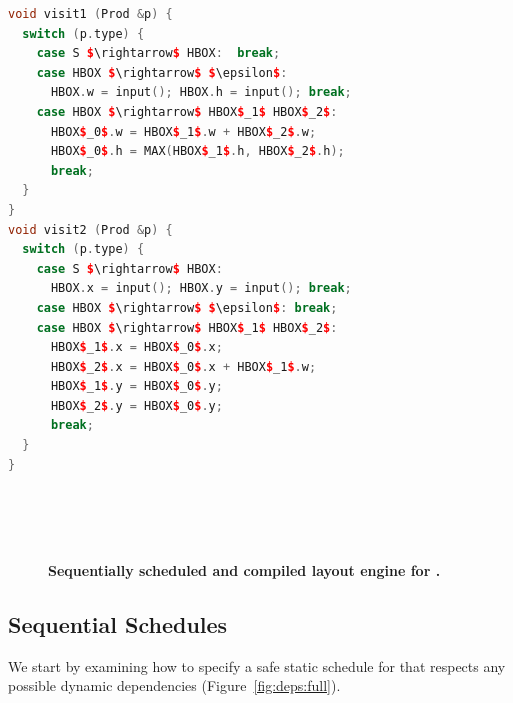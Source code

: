 \newsavebox{\hboxvisitors}
\begin{lrbox}{\hboxvisitors}%
\begin{minipage}{1\columnwidth}
\begin{lstlisting}[mathescape,language=C++]
void visit1 (Prod &p) {
  switch (p.type) {
    case S $\rightarrow$ HBOX:  break;
    case HBOX $\rightarrow$ $\epsilon$:
      HBOX.w = input(); HBOX.h = input(); break;
    case HBOX $\rightarrow$ HBOX$_1$ HBOX$_2$:
      HBOX$_0$.w = HBOX$_1$.w + HBOX$_2$.w;
      HBOX$_0$.h = MAX(HBOX$_1$.h, HBOX$_2$.h);
      break;
  }
}
void visit2 (Prod &p) {
  switch (p.type) {
    case S $\rightarrow$ HBOX:
      HBOX.x = input(); HBOX.y = input(); break;
    case HBOX $\rightarrow$ $\epsilon$: break;
    case HBOX $\rightarrow$ HBOX$_1$ HBOX$_2$:
      HBOX$_1$.x = HBOX$_0$.x;
      HBOX$_2$.x = HBOX$_0$.x + HBOX$_1$.w;
      HBOX$_1$.y = HBOX$_0$.y;
      HBOX$_2$.y = HBOX$_0$.y;
      break;
  }
}
\end{lstlisting}
\end{minipage}
\end{lrbox}




\begin{figure}
 \\
 \\
 \\
\caption{\textbf{Sequentially scheduled and compiled layout engine for \hlang{}.}}
\label{fig:hboxseq}
\end{figure}





\subsection{Sequential Schedules}  
\label{subseq:seqscheds}
We start by examining how to specify a safe static schedule for \hlang that respects any possible dynamic dependencies (Figure~\ref{fig:deps:full}).

